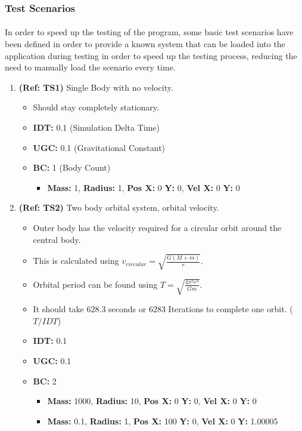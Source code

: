 \pagebreak
\subsubsection{Test Scenarios}
\paragraph{}
In order to speed up the testing of the program, some basic test scenarios have been defined in order to provide a known system that can be loaded into the application during testing in order to speed up the testing process, reducing the need to manually load the scenario every time.
\vspace{12pt}
\begin{enumerate}
\item \textbf{(Ref: TS1)} Single Body with no velocity.
  \begin{itemize}
  \item Should stay completely stationary.
  \item \textbf{IDT:} 0.1 (Simulation Delta Time)
  \item \textbf{UGC:} 0.1 (Gravitational Constant)
  \item \textbf{BC:} 1 (Body Count)
    \begin{itemize}
    \item \textbf{Mass:} 1, \textbf{Radius:} 1, \textbf{Pos X:} 0 \textbf{Y:} 0, \textbf{Vel X:} 0 \textbf{Y:} 0
    \end{itemize}
  \end{itemize}

\vspace{12pt}  
\item \textbf{(Ref: TS2)} Two body orbital system, orbital velocity.
  \begin{itemize}
  \item Outer body has the velocity required for a circular orbit around the central body.
  \item This is calculated using $v_{circular}=\sqrt{\frac{G(M+m)}{r}}$.
  \item Orbital period can be found using $T=\sqrt{\frac{4\pi^2r^3}{Gm}}$.
  \item It should take $628.3$ seconds or $6283$ Iterations to complete one orbit. ($T/IDT$)
  \item \textbf{IDT:} 0.1
  \item \textbf{UGC:} 0.1
  \item \textbf{BC:} 2
    \begin{itemize}
    \item \textbf{Mass:} 1000, \textbf{Radius:} 10, \textbf{Pos X:} 0 \textbf{Y:} 0, \textbf{Vel X:} 0 \textbf{Y:} 0
    \item \textbf{Mass:} 0.1, \textbf{Radius:} 1, \textbf{Pos X:} 100 \textbf{Y:} 0, \textbf{Vel X:} 0 \textbf{Y:} 1.00005
    \end{itemize}
  \end{itemize}
  

\end{enumerate}
